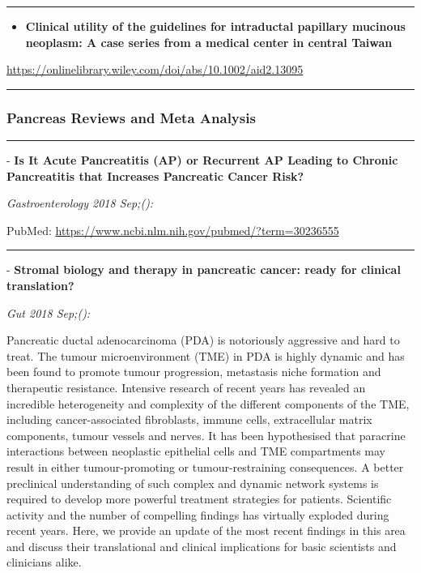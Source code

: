\documentclass[]{article}
\providecommand{\tightlist}{%
  \setlength{\itemsep}{0pt}\setlength{\parskip}{0pt}}
\begin{document}
\begin{center}\rule{0.5\linewidth}{\linethickness}\end{center}

\begin{itemize}
\tightlist
\item
  \textbf{Clinical utility of the guidelines for intraductal papillary
  mucinous neoplasm: A case series from a medical center in central
  Taiwan}
\end{itemize}

\url{https://onlinelibrary.wiley.com/doi/abs/10.1002/aid2.13095}

\begin{center}\rule{0.5\linewidth}{\linethickness}\end{center}

\hypertarget{pancreas-reviews-and-meta-analysis}{%
\subsubsection{Pancreas Reviews and Meta
Analysis}\label{pancreas-reviews-and-meta-analysis}}

\begin{center}\rule{0.5\linewidth}{\linethickness}\end{center}

 - \textbf{Is It Acute Pancreatitis (AP) or Recurrent AP Leading to
Chronic Pancreatitis that Increases Pancreatic Cancer Risk?}

\emph{Gastroenterology 2018 Sep;():}

PubMed: \url{https://www.ncbi.nlm.nih.gov/pubmed/?term=30236555}

{}

{}

\begin{center}\rule{0.5\linewidth}{\linethickness}\end{center}

 - \textbf{Stromal biology and therapy in pancreatic cancer: ready for
clinical translation?}

\emph{Gut 2018 Sep;():}

Pancreatic ductal adenocarcinoma (PDA) is notoriously aggressive and
hard to treat. The tumour microenvironment (TME) in PDA is highly
dynamic and has been found to promote tumour progression, metastasis
niche formation and therapeutic resistance. Intensive research of recent
years has revealed an incredible heterogeneity and complexity of the
different components of the TME, including cancer-associated
fibroblasts, immune cells, extracellular matrix components, tumour
vessels and nerves. It has been hypothesised that paracrine interactions
between neoplastic epithelial cells and TME compartments may result in
either tumour-promoting or tumour-restraining consequences. A better
preclinical understanding of such complex and dynamic network systems is
required to develop more powerful treatment strategies for patients.
Scientific activity and the number of compelling findings has virtually
exploded during recent years. Here, we provide an update of the most
recent findings in this area and discuss their translational and
clinical implications for basic scientists and clinicians alike.
\end{document}
